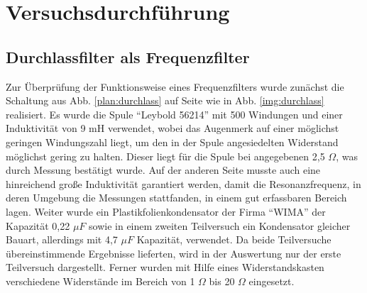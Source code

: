 \section{Versuchsdurchführung}
\subsection{Durchlassfilter als Frequenzfilter}
Zur Überprüfung der Funktionsweise eines Frequenzfilters wurde zunächst die Schaltung aus
Abb. \ref{plan:durchlass} auf Seite \pageref{plan:durchlass} wie in Abb. \ref{img:durchlass} realisiert. Es wurde die Spule \enquote{Leybold 56214} mit 500 Windungen und einer Induktivität von 9 mH verwendet, wobei das Augenmerk auf einer möglichst geringen Windungszahl liegt, um den in der Spule angesiedelten Widerstand möglichst gering zu halten. Dieser liegt für die Spule bei angegebenen 2,5 $ \Omega $, was durch Messung bestätigt wurde. Auf
der anderen Seite musste auch eine hinreichend große Induktivität garantiert werden, damit die Resonanzfrequenz, in deren Umgebung die Messungen stattfanden, in einem gut erfassbaren Bereich lagen. Weiter wurde ein Plastikfolienkondensator der Firma \enquote{WIMA} der Kapazität 0,22 $  \mu F $ sowie in einem zweiten Teilversuch ein Kondensator gleicher Bauart, allerdings mit 4,7 $  \mu F $ Kapazität, verwendet. Da beide Teilversuche übereinstimmende Ergebnisse lieferten, wird in der Auswertung nur der erste Teilversuch dargestellt. Ferner wurden
mit Hilfe eines Widerstandskasten verschiedene Widerstände im Bereich von 1 $ \Omega $ bis 20 $ \Omega $ eingesetzt.
